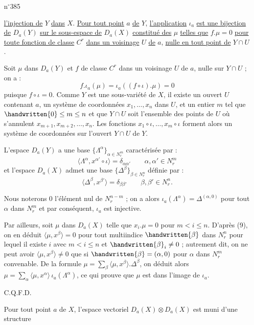 
n$^{\circ}$385

\uline{l'injection de} $Y$ \uline{dans} $X$. \uline{Pour tout point} $a$ \uline{de} $Y$, \uline{l'application} $\iota_a$ \uline{est une bijection de} $D_a(Y)$ \uline{sur le sous-espace de} $D_a(X)$ \uline{constitué des} $\mu$ \uline{telles que} $f.\mu=0$ \uline{pour toute fonction de classe} $C^r$ \uline{dans un voisinage} $U$ \uline{de} $a$, \uline{nulle en tout point de} $Y\cap U$.

Soit $\mu$ dans $D_a(Y)$ et $f$ de classe $C^r$ dans un voisinage $U$ de $a$, nulle sur $Y\cap U$ ; on a :
\[
 f.\iota_a(\mu)=\iota_a((f\circ\iota).\mu)=0
\]
puisque $f\circ\iota=0$. Comme $Y$ est une sous-variété de $X$, il existe un ouvert $U$ contenant $a$, un système de coordonnées $x_1,\ldots,x_n$ dans $U$, et un entier $m$ tel que $\handwritten{0}\leq m\leq n$ et que $Y\cap U$ soit l'ensemble des points de $U$ où s'annulent $x_{m+1},x_{m+2},\ldots,x_n$. Les fonctions $x_1\circ\iota,\ldots,x_m\circ\iota$ forment alors un système de coordonnées sur l'ouvert $Y\cap U$ de $Y$.

L'espace $D_a(Y)$ a une base $\{\Lambda^\alpha\}_{\alpha\in N_r^m}$ caractérisée par :
\[
 \langle\Lambda^\alpha,x^{\alpha'}\circ\iota\rangle=\delta_{\alpha\alpha'}\qquad \alpha,\alpha'\in N_r^m
\]
et l'espace $D_a(X)$ admet une base $\{\Delta^\beta\}_{\beta\in N_r^n}$ définie par :
\[
 \langle\Delta^\beta,x^{\beta'}\rangle=\delta_{\beta\beta'}\qquad \beta,\beta'\in N_r^n.
\]

Nous noterons $0$ l'élément nul de $N_r^{n-m}$ ; on a alors $\iota_a(\Lambda^\alpha)=\Delta^{(\alpha,0)}$ pour tout $\alpha$ dans $N_r^m$ et par conséquent, $\iota_a$ est injective.

Par ailleurs, soit $\mu$ dans $D_a(X)$ telle que $x_i.\mu=0$ pour $m<i\leq n$. D'après (9), on en déduit $\langle\mu,x^\beta\rangle=0$ pour tout multiindice $\handwritten{\beta}$ dans $N_r^n$ pour lequel il existe $i$ avec $m<i\leq n$ et $\handwritten{\beta}_i\ne 0$ ; autrement dit, on ne peut avoir $\langle\mu,x^\beta\rangle\ne 0$ que si $\handwritten{\beta}=(\alpha,0)$ pour $\alpha$ dans $N_r^m$ convenable. De la formule $\mu=\sum\limits_\beta\langle\mu,x^\beta\rangle.\Delta^\beta$, on déduit alors $\mu=\sum\limits_\alpha\langle\mu,x^\alpha\rangle\,\iota_a(\Lambda^\alpha)$, ce qui prouve que $\mu$ est dans l'image de $\iota_a$.

\hfill C.Q.F.D.

Pour tout point $a$ de $X$, l'espace vectoriel $D_a(X)\otimes D_a(X)$ est muni d'une structure
